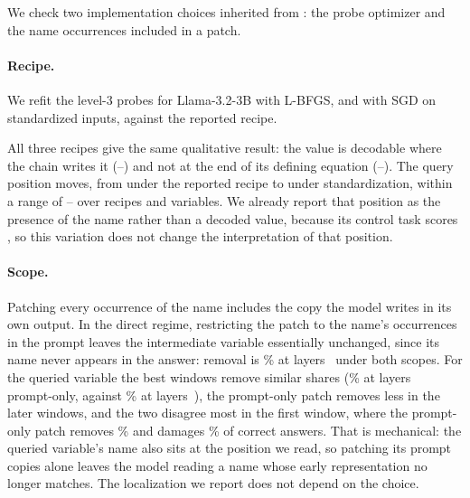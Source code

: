 \label{a-app:recipe}

We check two implementation choices inherited from \citet{kudo2026faithful}: the probe optimizer and the name occurrences included in a patch.

\paragraph{Recipe.} We refit the level-3 probes for Llama-3.2-3B with L-BFGS, and with SGD on
standardized inputs, against the reported recipe.

\begin{table}[t]
\centering\small
\sbox{\appendixtablebox}{}
\ifdim\wd\appendixtablebox>\textwidth
\resizebox{\textwidth}{!}{\usebox{\appendixtablebox}}
\else\usebox{\appendixtablebox}\fi
\caption{Best-layer true-value accuracy on neutral problems under three probe recipes
(proportions from 0 to 1).}
\label{a-tab:recipe}
\end{table}

All three recipes give the same qualitative result: the value is decodable where the chain writes it
(--) and not at the end of its defining equation
(--). The query position moves, from 
under the reported recipe to  under standardization, within a range of
-- over recipes and variables. We already report that
position as the presence of the name rather than a decoded value, because its control task
scores , so this variation does not change the interpretation of that position.

\paragraph{Scope.} Patching every occurrence of the name includes the copy the model writes in
its own output. In the direct regime, restricting the patch to the name's occurrences in the prompt leaves the
intermediate variable essentially unchanged, since its name never appears in the answer: removal is
\% at layers~ under both scopes. For the queried
variable the best windows remove similar shares (\% at
layers~ prompt-only, against \% at
layers~), the prompt-only patch removes less in the later windows, and the
two disagree most in the first window, where the prompt-only patch removes
\% and damages \% of correct answers. That
is mechanical: the queried variable's name also sits at the position we read, so patching its
prompt copies alone leaves the model reading a name whose early representation no longer
matches. The localization we report does not depend on the choice.

